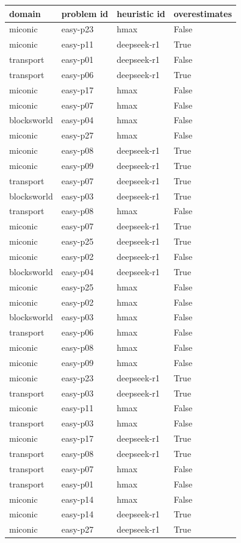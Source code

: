 \begin{longtable}{>{\raggedright\arraybackslash}p{}>{\raggedright\arraybackslash}p{}>{\raggedright\arraybackslash}p{}>{\raggedright\arraybackslash}p{}}
\hline
domain & problem id & heuristic id & overestimates \\ \hline\endhead
miconic & easy-p23 & hmax & False \\
miconic & easy-p11 & deepseek-r1 & True \\
transport & easy-p01 & deepseek-r1 & False \\
transport & easy-p06 & deepseek-r1 & True \\
miconic & easy-p17 & hmax & False \\
miconic & easy-p07 & hmax & False \\
blocksworld & easy-p04 & hmax & False \\
miconic & easy-p27 & hmax & False \\
miconic & easy-p08 & deepseek-r1 & True \\
miconic & easy-p09 & deepseek-r1 & True \\
transport & easy-p07 & deepseek-r1 & True \\
blocksworld & easy-p03 & deepseek-r1 & True \\
transport & easy-p08 & hmax & False \\
miconic & easy-p07 & deepseek-r1 & True \\
miconic & easy-p25 & deepseek-r1 & True \\
miconic & easy-p02 & deepseek-r1 & False \\
blocksworld & easy-p04 & deepseek-r1 & True \\
miconic & easy-p25 & hmax & False \\
miconic & easy-p02 & hmax & False \\
blocksworld & easy-p03 & hmax & False \\
transport & easy-p06 & hmax & False \\
miconic & easy-p08 & hmax & False \\
miconic & easy-p09 & hmax & False \\
miconic & easy-p23 & deepseek-r1 & True \\
transport & easy-p03 & deepseek-r1 & True \\
miconic & easy-p11 & hmax & False \\
transport & easy-p03 & hmax & False \\
miconic & easy-p17 & deepseek-r1 & True \\
transport & easy-p08 & deepseek-r1 & True \\
transport & easy-p07 & hmax & False \\
transport & easy-p01 & hmax & False \\
miconic & easy-p14 & hmax & False \\
miconic & easy-p14 & deepseek-r1 & True \\
miconic & easy-p27 & deepseek-r1 & True \\
\hline
\end{longtable}
\endgroup

